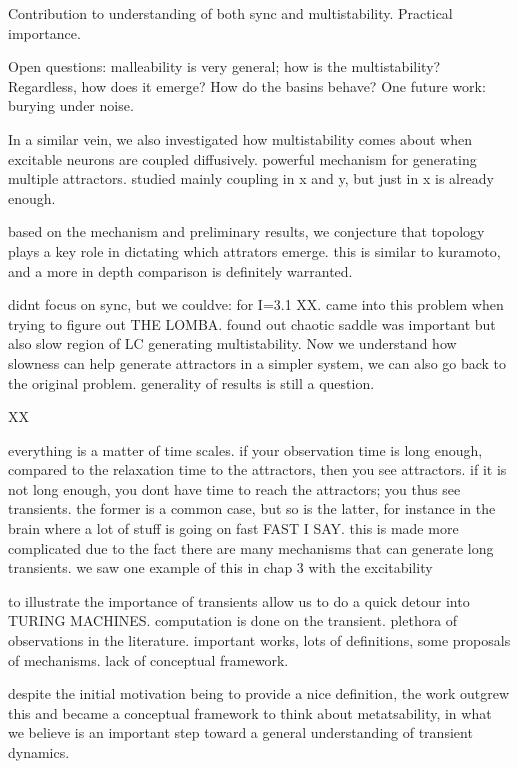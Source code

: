 Contribution to understanding of both sync and multistability. Practical importance. 

Open questions: malleability is very general; how is the multistability? Regardless, how does it emerge? How do the basins behave? One future work: burying under noise.

In a similar vein, we also investigated how multistability comes about when excitable neurons are coupled diffusively. 
powerful mechanism for generating multiple attractors.
studied mainly coupling in x and y, but just in x is already enough. 

based on the mechanism and preliminary results, we conjecture that topology plays a key role in dictating which attrators emerge. this is similar to kuramoto, and a more in depth comparison is definitely warranted.

didnt focus on sync, but we couldve: for I=3.1 XX.
came into this problem when trying to figure out THE LOMBA. found out chaotic saddle was important but also slow region of LC generating multistability. Now we understand how slowness can help generate attractors in a simpler system, we can also go back to the original problem. 
generality of results is still a question.

XX


everything is a matter of time scales. if your observation time is long enough, compared to the relaxation time to the attractors, then you see attractors. if it is not long enough, you dont have time to reach the attractors; you thus see transients. the former is a common case, but so is the latter, for instance in the brain where a lot of stuff is going on fast FAST I SAY. this is made more complicated due to the fact there are many mechanisms that can generate long transients. we saw one example of this in chap 3 with the excitability 

to illustrate the importance of transients allow us to do a quick detour into TURING MACHINES. computation is done on the transient. 
plethora of observations in the literature. important works, lots of definitions, some proposals of mechanisms. lack of conceptual framework. 


despite the initial motivation being to provide a nice definition, the work outgrew this and became a conceptual framework to think about metatsability, in what we believe is an important step toward a general understanding of transient dynamics. 

